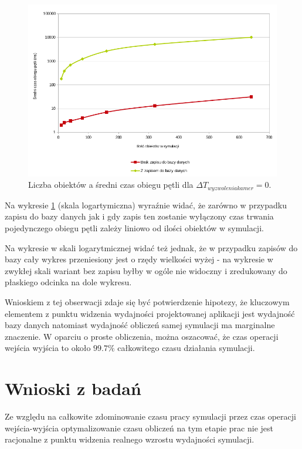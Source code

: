 \begin{figure}[htb]
    \begin{center}
	\includegraphics[width=\textwidth,keepaspectratio]{img/wykres_2}
	\caption{Liczba obiektów a średni czas obiegu pętli dla $\Delta T_{wyzwolenia kamer} = 0$.}
	\label{ex_2_chart}
    \end{center}
\end{figure}


\par{
Na wykresie \ref{ex_2_chart} (skala logartymiczna) wyraźnie widać, że zarówno w przypadku zapisu do bazy danych jak i gdy zapis ten zostanie wyłączony czas trwania pojedynczego obiegu pętli zależy liniowo od ilości obiektów w symulacji.
}
\par{
Na wykresie w skali logarytmicznej widać też jednak, że w przypadku zapisów do bazy cały wykres przeniesiony jest o rzędy wielkości wyżej - na wykresie w zwykłej skali wariant bez zapisu byłby w ogóle nie widoczny i zredukowany do płaskiego odcinka na dole wykresu.
}
\par{
Wnioskiem z tej obserwacji zdaje się być potwierdzenie hipotezy, że kluczowym elementem z punktu widzenia wydajności projektowanej aplikacji jest wydajność bazy danych natomiast wydajność obliczeń samej symulacji ma marginalne znaczenie. W oparciu o proste obliczenia, można oszacować, że czas operacji wejścia wyjścia to około $99.7\%$ całkowitego czasu działania symulacji.
}
\section{Wnioski z badań}
\par{
Ze względu na całkowite zdominowanie czasu pracy symulacji przez czas operacji wejścia-wyjścia optymalizowanie czasu obliczeń na tym etapie prac nie jest racjonalne z punktu widzenia realnego wzrostu wydajności symulacji.
}

